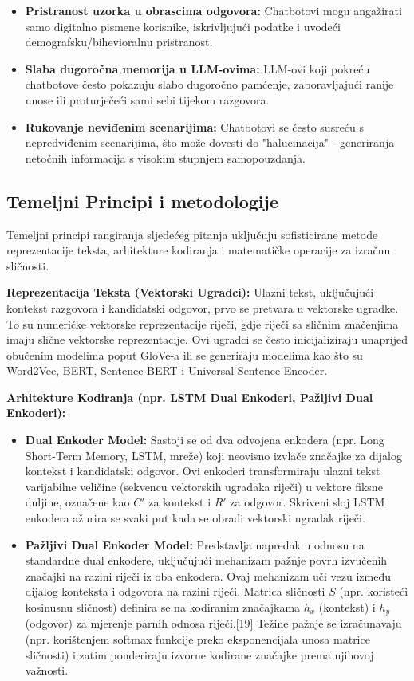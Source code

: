 \begin{itemize}
\item \textbf{Pristranost uzorka u obrascima odgovora:} Chatbotovi mogu angažirati samo digitalno pismene korisnike, iskrivljujući podatke i uvodeći demografsku/bihevioralnu pristranost.
\item \textbf{Slaba dugoročna memorija u LLM-ovima:} LLM-ovi koji pokreću chatbotove često pokazuju slabo dugoročno pamćenje, zaboravljajući ranije unose ili proturječeći sami sebi tijekom razgovora.
\item \textbf{Rukovanje neviđenim scenarijima:} Chatbotovi se često susreću s nepredviđenim scenarijima, što može dovesti do "halucinacija" - generiranja netočnih informacija s visokim stupnjem samopouzdanja.
\end{itemize}


\subsection{Temeljni Principi i metodologije}
Temeljni principi rangiranja sljedećeg pitanja uključuju sofisticirane metode reprezentacije teksta, arhitekture kodiranja i matematičke operacije za izračun sličnosti.

\textbf{Reprezentacija Teksta (Vektorski Ugradci):} Ulazni tekst, uključujući kontekst razgovora i kandidatski odgovor, prvo se pretvara u vektorske ugradke. To su numeričke vektorske reprezentacije riječi, gdje riječi sa sličnim značenjima imaju slične vektorske reprezentacije. Ovi ugradci se često inicijaliziraju unaprijed obučenim modelima poput GloVe-a ili se generiraju modelima kao što su Word2Vec, BERT, Sentence-BERT i Universal Sentence Encoder.

\textbf{Arhitekture Kodiranja (npr. LSTM Dual Enkoderi, Pažljivi Dual Enkoderi):}
\begin{itemize}
\item \textbf{Dual Enkoder Model:} Sastoji se od dva odvojena enkodera (npr. Long Short-Term Memory, LSTM, mreže) koji neovisno izvlače značajke za dijalog kontekst i kandidatski odgovor. Ovi enkoderi transformiraju ulazni tekst varijabilne veličine (sekvencu vektorskih ugradaka riječi) u vektore fiksne duljine, označene kao $C'$ za kontekst i $R'$ za odgovor. Skriveni sloj LSTM enkodera ažurira se svaki put kada se obradi vektorski ugradak riječi.

\item \textbf{Pažljivi Dual Enkoder Model:} Predstavlja napredak u odnosu na standardne dual enkodere, uključujući mehanizam pažnje povrh izvučenih značajki na razini riječi iz oba enkodera. Ovaj mehanizam uči vezu između dijalog konteksta i odgovora na razini riječi. Matrica sličnosti $S$ (npr. koristeći kosinusnu sličnost) definira se na kodiranim značajkama $h_x$ (kontekst) i $h_y$ (odgovor) za mjerenje parnih odnosa riječi.[19] Težine pažnje se izračunavaju (npr. korištenjem softmax funkcije preko eksponencijala unosa matrice sličnosti) i zatim ponderiraju izvorne kodirane značajke prema njihovoj važnosti.
\end{itemize}



